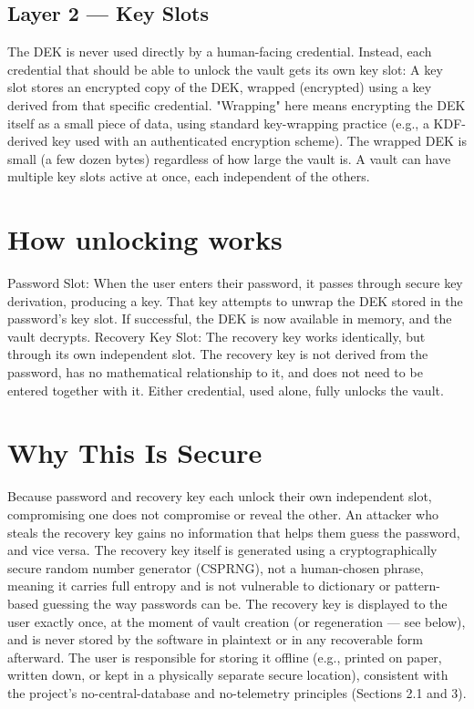 \subsection{Layer 2 — Key Slots}
The DEK is never used directly by a human-facing credential. Instead, each credential that should be able to unlock the vault gets its own key slot:
A key slot stores an encrypted copy of the DEK, wrapped (encrypted) using a key derived from that specific credential.
"Wrapping" here means encrypting the DEK itself as a small piece of data, using standard key-wrapping practice (e.g., a KDF-derived key used with an authenticated encryption scheme). The wrapped DEK is small (a few dozen bytes) regardless of how large the vault is.
A vault can have multiple key slots active at once, each independent of the others.

\section{How unlocking works}
Password Slot: When the user enters their password, it passes through secure key derivation, producing a key. That key attempts to unwrap the DEK stored in the password's key slot. If successful, the DEK is now available in memory, and the vault decrypts.
Recovery Key Slot: The recovery key works identically, but through its own independent slot. The recovery key is not derived from the password, has no mathematical relationship to it, and does not need to be entered together with it. Either credential, used alone, fully unlocks the vault.

\section{Why This Is Secure}
Because password and recovery key each unlock their own independent slot, compromising one does not compromise or reveal the other. An attacker who steals the recovery key gains no information that helps them guess the password, and vice versa.
The recovery key itself is generated using a cryptographically secure random number generator (CSPRNG), not a human-chosen phrase, meaning it carries full entropy and is not vulnerable to dictionary or pattern-based guessing the way passwords can be.
The recovery key is displayed to the user exactly once, at the moment of vault creation (or regeneration — see below), and is never stored by the software in plaintext or in any recoverable form afterward. The user is responsible for storing it offline (e.g., printed on paper, written down, or kept in a physically separate secure location), consistent with the project's no-central-database and no-telemetry principles (Sections 2.1 and 3).

